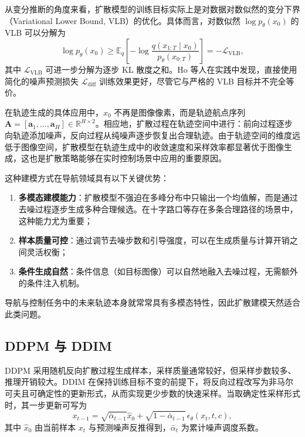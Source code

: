 从变分推断的角度来看，扩散模型的训练目标实际上是对数据对数似然的变分下界（Variational Lower Bound, VLB）的优化。具体而言，对数似然 $\log p_\theta(x_0)$ 的 VLB 可以分解为
\begin{equation}
\log p_\theta(x_0) \geq \mathbb{E}_q\!\left[-\log \frac{q(x_{1:T}\mid x_0)}{p_\theta(x_{0:T})}\right] = -\mathcal{L}_{\text{VLB}},
\end{equation}
其中 $\mathcal{L}_{\text{VLB}}$ 可进一步分解为逐步 KL 散度之和。Ho 等人\cite{ddpm2020}在实践中发现，直接使用简化的噪声预测损失 $\mathcal{L}_{\text{diff}}$ 训练效果更好，尽管它与严格的 VLB 目标并不完全等价。

在轨迹生成的具体应用中，$x_0$ 不再是图像像素，而是轨迹航点序列 $\mathbf{A} = [\mathbf{a}_1, \ldots, \mathbf{a}_H] \in \mathbb{R}^{H \times 2}$。相应地，扩散过程在轨迹空间中进行：前向过程逐步向轨迹添加噪声，反向过程从纯噪声逐步恢复出合理轨迹。由于轨迹空间的维度远低于图像空间，扩散模型在轨迹生成中的收敛速度和采样效率都显著优于图像生成，这也是扩散策略能够在实时控制场景中应用的重要原因。

这种建模方式在导航领域具有以下关键优势：
\begin{enumerate}
    \item \textbf{多模态建模能力}：扩散模型不强迫在多峰分布中只输出一个均值解，而是通过去噪过程逐步生成多种合理候选。在十字路口等存在多条合理路径的场景中，这种能力尤为重要；
    \item \textbf{样本质量可控}：通过调节去噪步数和引导强度，可以在生成质量与计算开销之间灵活权衡；
    \item \textbf{条件生成自然}：条件信息（如目标图像）可以自然地融入去噪过程，无需额外的条件注入机制。
\end{enumerate}
导航与控制任务中的未来轨迹本身就常常具有多模态特性，因此扩散建模天然适合此类问题。


\subsection{DDPM 与 DDIM}

DDPM 采用随机反向扩散过程生成样本，采样质量通常较好，但采样步数较多、推理开销较大\cite{ddpm2020}。DDIM 在保持训练目标不变的前提下，将反向过程改写为非马尔可夫且可确定性的更新形式，从而实现更少步数的快速采样\cite{ddim2020}。当取确定性采样形式时，其一步更新可写为
\begin{equation}
x_{t-1} = \sqrt{\bar\alpha_{t-1}}\hat x_0 + \sqrt{1-\bar\alpha_{t-1}}\,\epsilon_\theta(x_t,t,c),
\end{equation}
其中 $\hat x_0$ 由当前样本 $x_t$ 与预测噪声反推得到，$\bar\alpha_t$ 为累计噪声调度系数。

